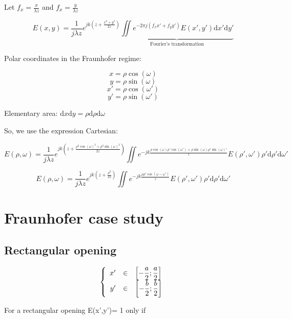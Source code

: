 \documentclass[10pt,a4paper]{article}
\begin{document}
Let $f_x=\frac{x}{\lambda z}$ and $f_x=\frac{y}{\lambda z}$

\[E(x,y)=\frac{1}{j\lambda z} e^{jk\left(z+\frac{x^2+y^2}{2z}\right)}\underbrace{\iint e^{-2\pi j(f_xx'+f_yy')}E(x',y')\mathrm{d}x'\mathrm{d}y'}_\text{Fourier's transformation}\]

Polar coordinates in the Fraunhofer regime:

\[x=\rho \cos(\omega) \]
\[y=\rho \sin(\omega) \]
\[x'=\rho \cos(\omega') \]
\[y'=\rho \sin(\omega') \]

Elementary area: $\mathrm{d}x\mathrm{d}y=\rho \mathrm{d}\rho \mathrm{d}\omega$

So, we use the expression Cartesian:

\[E(\rho,\omega)=\frac{1}{j\lambda z} e^{jk\left(z+\frac{\rho^2 \cos(\omega)^2+\rho^2 \sin(\omega)^2}{2z}\right)}\iint e^{-jk\frac{\rho \cos(\omega)\rho' \cos(\omega')+\rho \sin(\omega)\rho' \sin(\omega)'}{z}}E(\rho',\omega')\rho' \mathrm{d}\rho'\mathrm{d}\omega'\]

\[E(\rho,\omega)=\frac{1}{j\lambda z} e^{jk\left(z+\frac{\rho^2}{2z}\right)}\iint e^{-jk\frac{\rho\rho'\cos(\omega-\omega')}{z}}E(\rho',\omega')\rho' \mathrm{d}\rho'\mathrm{d}\omega'\]

\section{Fraunhofer case study}
	\subsection{Rectangular opening}
\[
\left \{
\begin{array}{r c l}
x' & \in & \left[-\dfrac{a}{2};\dfrac{a}{2}\right]\\
y' & \in & \left[-\dfrac{b}{2};\dfrac{b}{2}\right]
\end{array}
\right .
\]

For a rectangular opening E(x’,y’)= 1 only if
\end{document}
